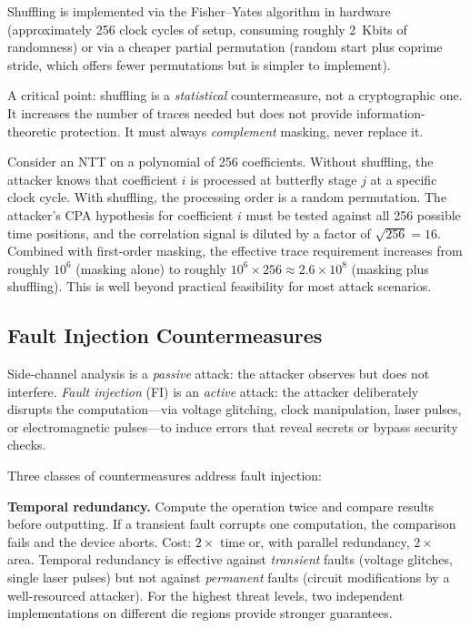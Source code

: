 Shuffling is implemented via the Fisher--Yates algorithm in hardware (approximately 256 clock cycles of setup, consuming roughly 2~Kbits of randomness) or via a cheaper partial permutation (random start plus coprime stride, which offers fewer permutations but is simpler to implement).

A critical point: shuffling is a \emph{statistical} countermeasure, not a cryptographic one.  It increases the number of traces needed but does not provide information-theoretic protection.  It must always \emph{complement} masking, never replace it.

\begin{example}
\label{ex:shuffling-ntt}
Consider an NTT on a polynomial of 256 coefficients.  Without shuffling, the attacker knows that coefficient $i$ is processed at butterfly stage $j$ at a specific clock cycle.  With shuffling, the processing order is a random permutation.  The attacker's CPA hypothesis for coefficient $i$ must be tested against all 256 possible time positions, and the correlation signal is diluted by a factor of $\sqrt{256} = 16$.  Combined with first-order masking, the effective trace requirement increases from roughly $10^6$ (masking alone) to roughly $10^6 \times 256 \approx 2.6 \times 10^8$ (masking plus shuffling).  This is well beyond practical feasibility for most attack scenarios.
\end{example}


\subsection{Fault Injection Countermeasures}
\label{subsec:fi-countermeasures}

Side-channel analysis is a \emph{passive} attack: the attacker observes but does not interfere.  \emph{Fault injection} (FI) is an \emph{active} attack: the attacker deliberately disrupts the computation---via voltage glitching, clock manipulation, laser pulses, or electromagnetic pulses---to induce errors that reveal secrets or bypass security checks.

Three classes of countermeasures address fault injection:

\textbf{Temporal redundancy.}  Compute the operation twice and compare results before outputting.  If a transient fault corrupts one computation, the comparison fails and the device aborts.  Cost: $2\times$ time or, with parallel redundancy, $2\times$ area.  Temporal redundancy is effective against \emph{transient} faults (voltage glitches, single laser pulses) but not against \emph{permanent} faults (circuit modifications by a well-resourced attacker).  For the highest threat levels, two independent implementations on different die regions provide stronger guarantees.

